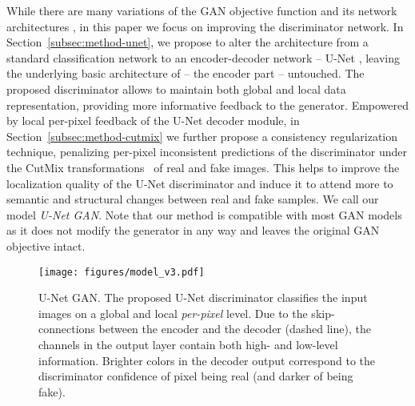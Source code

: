 \documentclass[10pt,twocolumn,letterpaper]{article}
\begin{document}
While there are many variations of the GAN objective function and its network architectures \cite{Kurach2018GANlandscape,LucicEqualGANs},
in this paper we focus on improving the discriminator network. In Section~\ref{subsec:method-unet}, we propose to alter the  architecture from a standard classification network to an encoder-decoder network -- U-Net \cite{Ronneberger2015UNetCN}, leaving the underlying basic architecture of  -- the encoder part -- untouched. The proposed discriminator allows to maintain both global and local data representation, providing more informative feedback to the generator.
Empowered by local per-pixel feedback of the U-Net decoder module, in Section~\ref{subsec:method-cutmix} we further propose a consistency regularization technique, penalizing per-pixel inconsistent predictions of the discriminator under the CutMix transformations~\cite{Yun2019CutMixRS} of real and fake images.
This helps to improve the localization quality of the U-Net discriminator and induce it to attend more to semantic and structural changes between real and fake samples. We call our model \emph{U-Net GAN}.
Note that our method is compatible with most GAN models as it does not modify the generator in any way and leaves the original GAN objective intact.

\begin{figure}[t]
\begin{centering}
\setlength{\tabcolsep}{0.1em}
\renewcommand{\arraystretch}{0}
\par\end{centering}
\begin{centering}
\vspace{-1em}
\hfill{}

\texttt{[image: figures/model\_v3.pdf]}
\par\end{centering}
\vspace{-0.5em}
\caption{U-Net GAN. The proposed U-Net discriminator classifies the input images on a global and local \emph{per-pixel} level. Due to the skip-connections between the encoder and the decoder (dashed line), the channels in the output layer contain both high- and low-level information. Brighter colors in the decoder output correspond to the discriminator confidence of pixel being real (and darker of being fake).}

\label{fig:method_overview}
\vspace{-0.5em}
\end{figure}
\end{document}
